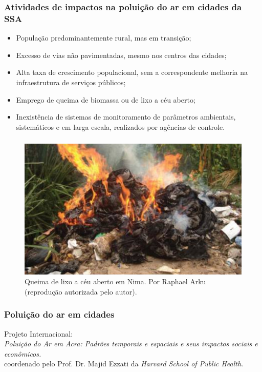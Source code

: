 \begin{frame}
  \frametitle{Atividades de impactos na poluição do ar em cidades da SSA}
  \begin{itemize}
    \item População predominantemente rural, mas em transição;
    \item Excesso de vias não pavimentadas, mesmo nos centros das cidades;
    \item Alta taxa de crescimento populacional, sem a correspondente melhoria 
        na infraestrutura de serviços públicos;
    \item Emprego de queima de biomassa ou de lixo a céu aberto;
    \item Inexistência de sistemas de monitoramento de parâmetros ambientais, sistemáticos e em larga escala,
        realizados por agências de controle.
  \end{itemize}
\end{frame}

\begin{frame}
  \frametitle{}
  \begin{figure}[H]
    \centering
      \includegraphics[width=0.5\linewidth]{../../inputs/images/zheng/arku3.jpeg}
      \caption{Queima de lixo a céu aberto em Nima. Por Raphael Arku 
             (reprodução autorizada pelo autor).\label{fig:nima_lixo}}
  \end{figure} 
\end{frame}

\begin{frame}
  \frametitle{Poluição do ar em cidades}
  Projeto Internacional: \\
  \textit{Poluição do Ar em Acra: Padrões temporais e espaciais e seus impactos sociais e econômicos.} \\ 
  coordenado pelo Prof. Dr. Majid Ezzati da \textit{Harvard School of Public Health}.
\end{frame}

